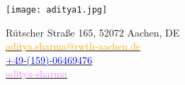 \documentclass[a4paper]{deedy-resume-openfont}
\begin{document}
%
 
%
%
%

\flushleft \texttt{[image: aditya1.jpg]} 

\vspace{-30mm}

{ %
Rütscher Straße 165, 52072 Aachen, DE\\
\href{mailto:aditya.sharma@rwth-aachen.de}{\textcolor{orange}{aditya.sharma@rwth-aachen.de}} \\
\href{tel:+4915906469476}{\textcolor{blue}{+49-(159)-06469476}}\\
\href{https://www.linkedin.com/in/aditya-sharma-31640b94/}{\textcolor{violet}{aditya-sharma}}
}

%
%
\end{document}
